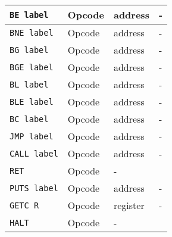 \documentclass[10pt,a4paper]{scrartcl}
\newcommand{\code}[1]{\texttt{#1}}
\begin{document}
\begin{tabular}{|l|c|c|c|c|c|c|c|c|c|c|c|c|c|c|c|c|c|c|c|c|c|c|c|c|c|c|c|c|c|c|c|c|}
    \code{BE label} & \multicolumn{8}{|l|}{Opcode} & \multicolumn{16}{|l|}{address} & \multicolumn{8}{|l|}{-} \\ \hline
    \code{BNE label} & \multicolumn{8}{|l|}{Opcode} & \multicolumn{16}{|l|}{address} & \multicolumn{8}{|l|}{-} \\ \hline
    \code{BG label} & \multicolumn{8}{|l|}{Opcode} & \multicolumn{16}{|l|}{address} & \multicolumn{8}{|l|}{-} \\ \hline
    \code{BGE label} & \multicolumn{8}{|l|}{Opcode} & \multicolumn{16}{|l|}{address} & \multicolumn{8}{|l|}{-} \\ \hline
    \code{BL label} & \multicolumn{8}{|l|}{Opcode} & \multicolumn{16}{|l|}{address} & \multicolumn{8}{|l|}{-} \\ \hline
    \code{BLE label} & \multicolumn{8}{|l|}{Opcode} & \multicolumn{16}{|l|}{address} & \multicolumn{8}{|l|}{-} \\ \hline
    \code{BC label} & \multicolumn{8}{|l|}{Opcode} & \multicolumn{16}{|l|}{address} & \multicolumn{8}{|l|}{-} \\ \hline
    \code{JMP label} & \multicolumn{8}{|l|}{Opcode} & \multicolumn{16}{|l|}{address} & \multicolumn{8}{|l|}{-} \\ \hline
    \code{CALL label} & \multicolumn{8}{|l|}{Opcode} & \multicolumn{16}{|l|}{address} & \multicolumn{8}{|l|}{-} \\ \hline
    \code{RET} & \multicolumn{8}{|l|}{Opcode} & \multicolumn{24}{|l|}{-} \\ \hline
    \code{PUTS label} & \multicolumn{8}{|l|}{Opcode} & \multicolumn{16}{|l|}{address} & \multicolumn{8}{|l|}{-} \\ \hline
    \code{GETC R} & \multicolumn{8}{|l|}{Opcode} & \multicolumn{4}{|l|}{register} & \multicolumn{20}{|l|}{-} \\ \hline
    \code{HALT} & \multicolumn{8}{|l|}{Opcode} & \multicolumn{24}{|l|}{-} \\ \hline
\end{tabular}
\end{document}
